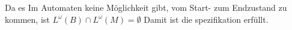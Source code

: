 Da es Im Automaten keine Möglichkeit gibt, vom Start- zum Endzustand zu kommen, ist $L^\omega(B)\cap L^\omega(M)=\emptyset$ Damit ist die spezifikation erfüllt.